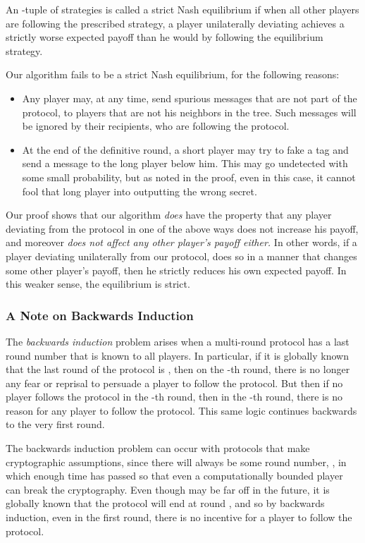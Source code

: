 \documentclass[12pt]{article}
\theoremstyle{definition}
\begin{document}
An -tuple of strategies is called a strict Nash equilibrium
if when all other players are following the prescribed strategy, 
a player unilaterally deviating  achieves a strictly worse expected payoff 
than he would by following the equilibrium strategy. 

Our algorithm fails to be a strict Nash equilibrium, for the following 
reasons:
\begin{itemize}
\item Any player may, at any time, send spurious messages that are not 
part of the protocol, to players that are not his neighbors
in the tree. Such messages will be ignored by their recipients, who are 
following the protocol. 
\item At the end of the definitive round, a short player may try to 
fake a tag and send a message to the long player below him. This may 
go undetected with some small probability, but as noted in the proof,
even in this case, it cannot fool that long player into outputting the 
wrong secret.
\end{itemize}
Our proof shows that our algorithm \emph{does} have the property that 
any player deviating from the protocol in one of the above ways does not increase his 
payoff, and moreover \emph{does not 
affect any other player's payoff either.} In other words, if a player 
deviating unilaterally from our protocol, does so in a manner that 
changes some other player's payoff, then he strictly reduces his own 
expected payoff. 
In this weaker sense, the equilibrium is strict. 

\subsubsection{A Note on Backwards Induction}\label{sec:backind}

The \emph{backwards induction} problem arises when a multi-round
protocol has a last round number that is known to all players.  In
particular, if it is globally known that the last round of the
protocol is , then on the -th round, there is no longer
any fear or reprisal to persuade a player to follow the protocol.  But
then if no player follows the protocol in the -th round, then in
the -th round, there is no reason for any player to follow
the protocol.  This same logic continues backwards to the very first
round.

The backwards induction problem can occur with protocols that make
cryptographic assumptions, since there will always be some round
number, , in which enough time has passed so that even a
computationally bounded player can break the cryptography.  Even
though  may be far off in the future, it is globally known that
the protocol will end at round , and so by backwards induction,
even in the first round, there is no incentive for a player to follow
the protocol.
\end{document}
